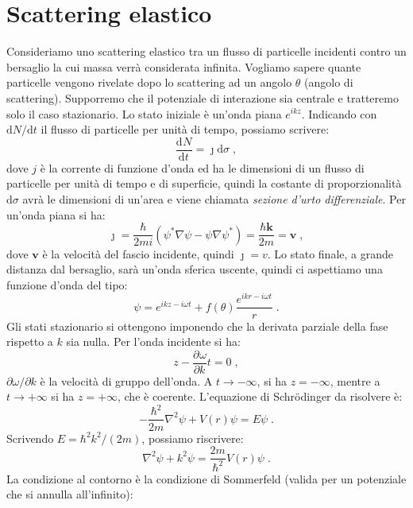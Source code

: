 \documentclass[12pt,a4paper]{report}
\theoremstyle{definition}
\newcommand{\pdev}[3][]{\frac{\partial^{#1} #2}{\partial #3^{#1}}}
\newcommand{\dev}[3][]{\frac{\mathrm{d}^{#1} #2}{\mathrm{d} #3^{#1}}}
\numberwithin{equation}{section}
\newcommand{\diff}[1][]{\mathrm{d}#1}
\newcommand{\Sch}{Schrödinger}
\begin{document}
\section{Scattering elastico}
Consideriamo uno scattering elastico tra un flusso di particelle incidenti contro un bersaglio la cui massa verrà considerata infinita. Vogliamo sapere quante particelle vengono rivelate dopo lo scattering ad un angolo $\theta$ (angolo di scattering). Supporremo che il potenziale di interazione sia centrale e tratteremo solo il caso stazionario. Lo stato iniziale è un'onda piana $e^{ikz}$. Indicando con $\diff{N}/\diff{t}$ il flusso di particelle per unità di tempo, possiamo scrivere:
\begin{equation}
\dev{N}{t}=\jmath\diff{\sigma}\;,
\end{equation}
dove $j$ è la corrente di funzione d'onda ed ha le dimensioni di un flusso di particelle per unità di tempo e di superficie, quindi la costante di proporzionalità $\diff{\sigma}$ avrà le dimensioni di un'area e viene chiamata \emph{sezione d'urto differenziale}. Per un'onda piana si ha:
\begin{equation}
\boldsymbol{\jmath}=\frac{\hbar}{2mi}(\psi^*\nabla\psi-\psi\nabla\psi^*)=\frac{\hbar\mathbf{k}}{2m}=\mathbf{v}\;,
\end{equation}
dove $\mathbf{v}$ è la velocità del fascio incidente, quindi $\jmath=v$. Lo stato finale, a grande distanza dal bersaglio, sarà un'onda sferica uscente, quindi ci aspettiamo una funzione d'onda del tipo:
\begin{equation}
\psi=e^{ikz-i\omega t}+f(\theta)\frac{e^{ikr-i\omega t}}{r}\;.
\end{equation}
Gli stati stazionario si ottengono imponendo che la derivata parziale della fase rispetto a $k$ sia nulla. Per l'onda incidente si ha:
\begin{equation}
z-\pdev{\omega}{k}t=0\;,
\end{equation}
$\partial\omega/\partial k$ è la velocità di gruppo dell'onda. A $t\to -\infty$, si ha $z=-\infty$, mentre a $t\to+\infty$ si ha $z=+\infty$, che è coerente. L'equazione di \Sch\; da risolvere è:
\begin{equation}
-\frac{\hbar^2}{2m}\nabla^2\psi+V(r)\psi=E\psi\;.
\end{equation}
Scrivendo $E=\hbar^2k^2/(2m)$, possiamo riscrivere:
\begin{equation}
\nabla^2\psi+k^2\psi=\frac{2m}{\hbar^2}V(r)\psi\;.
\end{equation}
La condizione al contorno è la condizione di Sommerfeld (valida per un potenziale che si annulla all'infinito):
\end{document}

